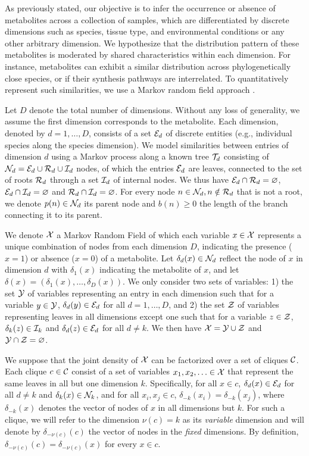 \documentclass[
11pt, %
oneside, %
english, %
singlespacing, %
headsepline, %
chapterinoneline, %
]{MastersDoctoralThesis} %
\def\E{\mathbb{E}}
\def\Ccal{{\cal C}}
\def\E{{\cal E}}
\def\I{{\cal I}}
\def\N{{\cal N}}
\def\R{{\cal R}}
\def\T{{\cal T}}
\def\X{{\cal X}}
\def\Y{{\cal Y}}
\def\Z{{\cal Z}}
\begin{document}
As previously stated, our objective is to infer the occurrence or absence of metabolites across a collection of samples, which are differentiated by discrete dimensions such as species, tissue type, and environmental conditions or any other arbitrary dimension. We hypothesize that the distribution pattern of these metabolites is moderated by shared characteristics within each dimension. For instance, metabolites can exhibit a similar distribution across phylogenetically close species, or if their synthesis pathways are interrelated. To quantitatively represent such similarities, we use a Markov random field approach \cite{sherringtonSolvableModelSpinGlass1975, kindermannMarkovRandomFields1980}.

Let $D$ denote the total number of dimensions. Without any loss of generality, we assume the first dimension corresponds to the metabolite. Each dimension, denoted by $d=1, \ldots, D$, consists of a set $\E_d$ of discrete entities (e.g., individual species along the species dimension). We model similarities between entries of dimension $d$ using a Markov process along a known tree $\T_d$ consisting of $\N_d = \E_d \cup \R_d \cup \I_d$ nodes, of which the entries $\E_d$ are leaves, connected to the set of roots $\R_d$ through a set $\I_d$ of internal nodes. We thus have $\E_d \cap \R_d = \varnothing$, $\E_d \cap \I_d = \varnothing$ and $\R_d \cap \I_d = \varnothing$. For every node $n \in \N_d, n \notin \R_d$ that is not a root, we denote $p(n) \in \N_d$ its parent node and $b(n) \geq 0$ the length of the branch connecting it to its parent.

We denote $\X$ a Markov Random Field of which each variable $x \in \X$ represents a unique combination of nodes from each dimension $D$, indicating the presence ($x=1$) or absence ($x=0$) of a metabolite. Let $\delta_d(x) \in \N_d$ reflect the node of $x$ in dimension $d$ with $\delta_1(x)$ indicating the metabolite of $x$, and let $\delta(x)=(\delta_1(x), \ldots, \delta_D(x))$. We only consider two sets of variables: 1) the set $\Y$ of variables representing an entry in each dimension such that for a variable $y\in\Y$, $\delta_d(y) \in \E_d$ for all $d=1, \ldots, D$, and 2) the set $\Z$ of variables representing leaves in all dimensions except one such that for a variable $z \in \Z$, $\delta_k(z) \in \I_k$ and $\delta_d(z) \in \E_d$ for all $d \neq k$. We then have $\X = \Y \cup \Z$ and $\Y \cap \Z = \varnothing$.

We suppose that the joint density of $\X$ can be factorized over a set of cliques $\Ccal$. Each clique $c \in \Ccal$ consist of a set of variables $x_1, x_2, \ldots \in \X$ that represent the same leaves in all but one dimension $k$. Specifically, for all $x \in c$, $\delta_d(x) \in \E_d$ for all $d \neq k$ and $\delta_k(x) \in \N_k$, and for all $x_i, x_j \in c$, $\delta_{-k}(x_i) = \delta_{-k}(x_j)$, where $\delta_{-k}(x)$ denotes the vector of nodes of $x$ in all dimensions but $k$. For such a clique, we will refer to the dimension $\nu(c) = k$ as its \emph{variable} dimension and will denote by $\delta_{-\nu(c)}(c)$ the vector of nodes in the \emph{fixed} dimensions. By definition, $\delta_{-\nu(c)}(c)=\delta_{-\nu(c)}(x)$ for every $x \in c$.
\end{document}
